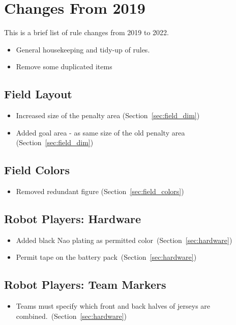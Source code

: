 \section{Changes From 2019}
This is a brief list of rule changes from 2019 to 2022.

\begin{itemize}
  \item General housekeeping and tidy-up of rules.
  \item Remove some duplicated items
\end{itemize}

\subsection*{Field Layout}
\begin{itemize}
  \item Increased size of the penalty area (\cf Section~\ref{sec:field_dim})
  \item Added goal area - as same size of the old penalty area (\cf Section~\ref{sec:field_dim})
\end{itemize}

\subsection*{Field Colors}
\begin{itemize}
  \item Removed redundant figure (\cf Section~\ref{sec:field_colors})
\end{itemize}

\subsection*{Robot Players: Hardware}
\begin{itemize}
  \item Added black Nao plating as permitted color~(\cf Section~\ref{sec:hardware})
  \item Permit tape on the battery pack~(\cf Section~\ref{sec:hardware})
\end{itemize}

\subsection*{Robot Players: Team Markers}
\begin{itemize}
  \item Teams must specify which front and back halves of jerseys are combined.~(\cf Section~\ref{sec:hardware})
\end{itemize}

